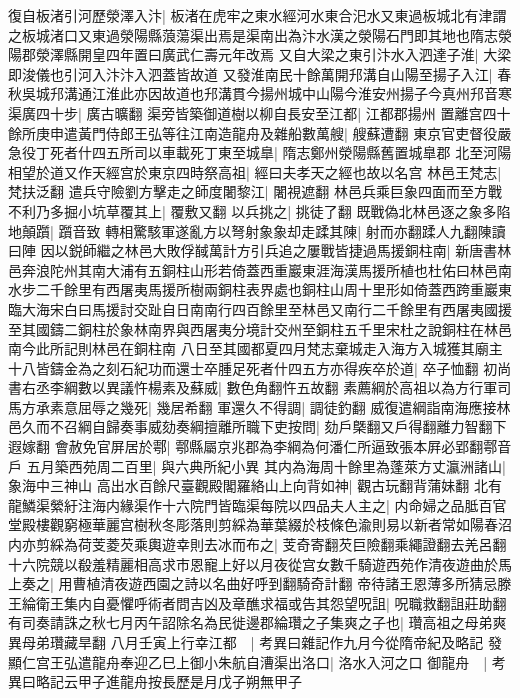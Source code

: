 復自板渚引河歷滎澤入汴|{
	板渚在虎牢之東水經河水東合汜水又東過板城北有津謂之板城渚口又東過滎陽縣蒗蕩渠出焉是渠南出為汴水漢之滎陽石門即其地也隋志滎陽郡滎澤縣開皇四年置曰廣武仁壽元年改焉}
又自大梁之東引汴水入泗達子淮|{
	大梁即浚儀也引河入汴汴入泗蓋皆故道}
又發淮南民十餘萬開䢴溝自山陽至揚子入江|{
	春秋吳城䢴溝通江淮此亦因故道也䢴溝貫今揚州城中山陽今淮安州揚子今真州䢴音寒}
渠廣四十步|{
	廣古曠翻}
渠旁皆築御道樹以柳自長安至江都|{
	江都郡揚州}
置離宫四十餘所庚申遣黃門侍郎王弘等往江南造龍舟及雜船數萬艘|{
	艘蘇遭翻}
東京官吏督役嚴急役丁死者什四五所司以車載死丁東至城臯|{
	隋志鄭州滎陽縣舊置城臯郡}
北至河陽相望於道又作天經宫於東京四時祭高祖|{
	經曰夫孝天之經也故以名宫}
林邑王梵志|{
	梵扶泛翻}
遣兵守險劉方擊走之師度闍黎江|{
	闍視遮翻}
林邑兵乘巨象四面而至方戰不利乃多掘小坑草覆其上|{
	覆敷又翻}
以兵挑之|{
	挑徒了翻}
既戰偽北林邑逐之象多陷地顛躓|{
	躓音致}
轉相驚駭軍遂亂方以弩射象象却走蹂其陳|{
	射而亦翻蹂人九翻陳讀曰陣}
因以鋭師繼之林邑大敗俘馘萬計方引兵追之屢戰皆捷過馬援銅柱南|{
	新唐書林邑奔浪陀州其南大浦有五銅柱山形若倚蓋西重巖東涯海漢馬援所植也杜佑曰林邑南水步二千餘里有西屠夷馬援所樹兩銅柱表界處也銅柱山周十里形如倚蓋西跨重巖東臨大海宋白曰馬援討交趾自日南南行四百餘里至林邑又南行二千餘里有西屠夷國援至其國鑄二銅柱於象林南界與西屠夷分境計交州至銅柱五千里宋杜之說銅柱在林邑南今此所記則林邑在銅柱南}
八日至其國都夏四月梵志棄城走入海方入城獲其廟主十八皆鑄金為之刻石紀功而還士卒腫足死者什四五方亦得疾卒於道|{
	卒子恤翻}
初尚書右丞李綱數以異議忤楊素及蘇威|{
	數色角翻忤五故翻}
素薦綱於高祖以為方行軍司馬方承素意屈辱之幾死|{
	幾居希翻}
軍還久不得調|{
	調徒釣翻}
威復遣綱詣南海應接林邑久而不召綱自歸奏事威劾奏綱擅離所職下吏按問|{
	劾戶槩翻又戶得翻離力智翻下遐嫁翻}
會赦免官屏居於鄠|{
	鄠縣屬京兆郡為李綱為何潘仁所逼致張本屛必郢翻鄠音戶}
五月築西苑周二百里|{
	與六典所紀小異}
其内為海周十餘里為蓬萊方丈瀛洲諸山|{
	象海中三神山}
高出水百餘尺臺觀殿閣羅絡山上向背如神|{
	觀古玩翻背蒲妹翻}
北有龍鱗渠縈紆注海内緣渠作十六院門皆臨渠每院以四品夫人主之|{
	内命婦之品胝百官}
堂殿樓觀窮極華麗宫樹秋冬彫落則剪綵為華葉綴於枝條色渝則易以新者常如陽春沼内亦剪綵為荷芰菱芡乘輿遊幸則去冰而布之|{
	芰奇寄翻芡巨險翻乘繩證翻去羌呂翻}
十六院競以殽羞精麗相高求市恩寵上好以月夜從宫女數千騎遊西苑作清夜遊曲於馬上奏之|{
	用曹植清夜遊西園之詩以名曲好呼到翻騎奇計翻}
帝待諸王恩薄多所猜忌滕王綸衛王集内自憂懼呼術者問吉凶及章醮求福或告其怨望呪詛|{
	呪職救翻詛莊助翻}
有司奏請誅之秋七月丙午詔除名為民徙邊郡綸瓚之子集爽之子也|{
	瓚高祖之母弟爽異母弟瓚藏旱翻}
八月壬寅上行幸江都　|{
	考異曰雜記作九月今從隋帝紀及略記}
發顯仁宫王弘遣龍舟奉迎乙巳上御小朱航自漕渠出洛口|{
	洛水入河之口}
御龍舟　|{
	考異曰略記云甲子進龍舟按長歷是月戊子朔無甲子}
